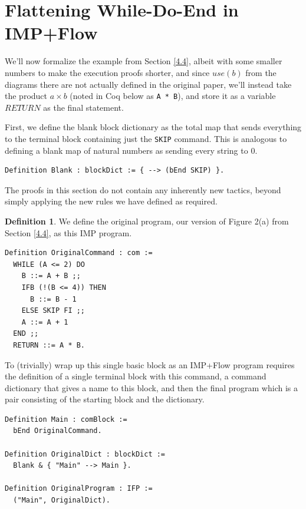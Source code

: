 \documentclass[12pt,notitlepage]{report}
\theoremstyle{plain}
\theoremstyle{definition}
\newtheorem{defin}[theo]{Definition}
\numberwithin{equation}{section}
\begin{document}
\section{Flattening While-Do-End in IMP+Flow}

We'll now formalize the example from Section \ref{4.4}, albeit with some smaller numbers to make the execution proofs shorter, and since $use(b)$ from the diagrams there are not actually defined in the original paper, we'll instead take the product $a \times b$ (noted in Coq below as \verb$A * B$), and store it as a variable $RETURN$ as the final statement.

\par First, we define the blank block dictionary as the total map that sends everything to the terminal block containing just the \verb$SKIP$ command.  This is analogous to defining a blank map of natural numbers as sending every string to 0.

\begin{verbatim}
Definition Blank : blockDict := { --> (bEnd SKIP) }.
\end{verbatim}

The proofs in this section do not contain any inherently new tactics, beyond simply applying the new rules we have defined as required.

\begin{defin}
    We define the original program, our version of Figure 2(a) from Section \ref{4.4}, as this IMP program.
    
    \begin{verbatim}
Definition OriginalCommand : com :=
  WHILE (A <= 2) DO
    B ::= A + B ;;
    IFB (!(B <= 4)) THEN
      B ::= B - 1
    ELSE SKIP FI ;;
    A ::= A + 1
  END ;;
  RETURN ::= A * B.\end{verbatim}
    
    To (trivially) wrap up this single basic block as an IMP+Flow program requires the definition of a single terminal block with this command, a command dictionary that gives a name to this block, and then the final program which is a pair consisting of the starting block and the dictionary.
    
    \begin{verbatim}
Definition Main : comBlock :=
  bEnd OriginalCommand.

Definition OriginalDict : blockDict :=
  Blank & { "Main" --> Main }.

Definition OriginalProgram : IFP :=
  ("Main", OriginalDict).\end{verbatim}
\end{defin}
\end{document}
